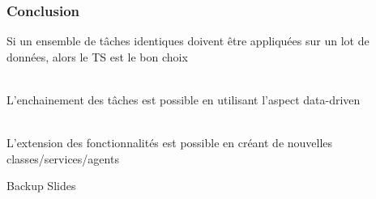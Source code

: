 \documentclass[10pt,table,dvipsnames]{beamer}
\newcommand{\interstitial}[1]{\begin{frame}\begin{block}{}\centering\Huge{#1}\end{block} \end{frame}}
\newcommand{\backupslides}{\interstitial{Backup Slides}}
\begin{document}
\begin{frame}
\frametitle{Conclusion}
Si un ensemble de t\^aches identiques doivent \^etre appliqu\'ees sur
un lot de donn\'ees, alors le TS est le bon choix

~\\

L'enchainement des t\^aches est possible en utilisant l'aspect
data-driven

~\\

L'extension des fonctionnalit\'es est possible en cr\'eant de nouvelles classes/services/agents
\label{lastframe}
\end{frame}

\backupslides 
\end{document}
